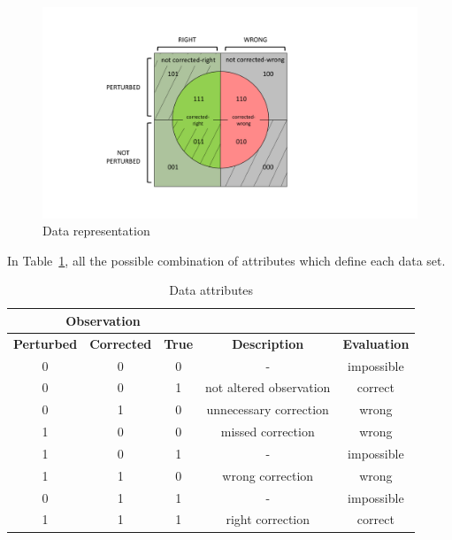 \documentclass[12pt]{article}
\begin{document}
\begin{figure}[hbpt]
\includegraphics[width=\linewidth,clip=true,trim=100 30 150
60]{confusionCircle.pdf}
\caption{Data representation}
\label{confusionCircle}
\end{figure}

In Table~\ref{tab:features}, all the possible combination of attributes which
define each data set.

\begin{table}[htbp]
  \centering
    \begin{tabularx}{\linewidth}{ccc|cc}
    \multicolumn{3}{c}{\textbf{Observation}} &       &  \\
    \midrule
    \textbf{Perturbed} & \textbf{Corrected} & \textbf{True} & \textbf{Description} & \textbf{Evaluation} \\
    \midrule
    0     & 0     & 0     &   -    & impossible \\
    0     & 0     & 1     & not altered observation & correct \\
    0     & 1     & 0     & unnecessary correction & wrong \\
    1     & 0     & 0     & missed correction & wrong \\
    1     & 0     & 1     &   -    & impossible \\
    1     & 1     & 0     & wrong correction & wrong \\
    0     & 1     & 1     &   -    & impossible \\
    1     & 1     & 1     & right  correction & correct \\
    \bottomrule
    \end{tabularx}%
    \caption{Data attributes}
  \label{tab:features}%
\end{table}%
\end{document}
